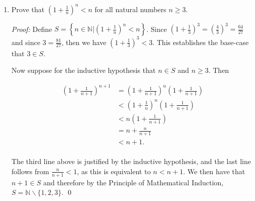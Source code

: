 \documentclass[12pt]{article}
\begin{document}
{\begin{enumerate}
Now suppose for the inductive hypothesis that $n\in \mathbb{N}$ and $n\in S$.  Since $n\in S$ we can infer that there is some $k\in \mathbb{Z}$ such that $3^{4n+1} - 5^{2n-1} = 7k$.  Hence

\begin{align*}
  3^{4(n+1)+1}-5^{2(n+1)-1} &= 3^{4n+5} - 5^{2n+1} \\[.3cm]
  &= 3^4\cdot 3^{4n+1}-5^2\cdot 5^{2n-1} \\[.3cm]
  &= (77+4)3^{4n+1} + (21+4)5^{2n-1} \\[.3cm]
  &= 77\cdot 3^{4n+1}-21\cdot 5^{2n-1}+4(3^{4n+1}-5^{2n-1}) \\[.3cm]
  &= 7(11\cdot 3^{4n+1}-3\cdot 5^{2n-1})+4\cdot 7k \\[.3cm]
  &= 7(11\cdot 3^{4n+1}-3\cdot 5^{2n-1}+28). \\
\end{align*}

Therefore $3^{4(n+1)+1}-5^{2(n+1)-1} = 3^{4n+5} - 5^{2n+1}$ is divisible by 7, which is the condition for $n+1\in S$.  So by the Principle of Mathematical Induction we have $S=\mathbb{N}$, which is to say that for every $n\in\mathbb{N}$ we have that $3^{4n+1}-5^{2n-1}$ is divisible by 7. \qed

\item Prove that $\displaystyle \left(1 + \frac{1}{n}\right)^n < n$ for all natural numbers $n \geq 3$.

{\it Proof:} Define $S=\left\{n\in\mathbb{N}|\left(1+\frac 1 n\right)^n<n\right\}$.  Since $\left(1+\frac 1 3\right)^3 = \left(\frac{4}{3}\right)^3 = \frac{64}{27}$ and since $3 = \frac{81}{27}$, then we have $(1+\frac 1 3)^3 < 3$.  This establishes the base-case that $3\in S$.

Now suppose for the inductive hypothesis that $n\in S$ and $n\geq 3$.  Then

\begin{align*}
  \left(1+\frac 1 {n+1}\right)^{n+1} & = \left(1+\frac 1 {n+1}\right)^{n}\left(1+\frac 1 {n+1}\right) \\[.3cm]
  &< \left(1+\frac 1 {n}\right)^{n} \left(1+\frac 1 {n+1}\right) \\[.3cm]
  &< n\left(1+\frac{1}{n+1}\right) \\[.3cm]
  &= n+\frac{n}{n+1} \\[.3cm]
  &< n+1.\\
\end{align*}

The third line above is justified by the inductive hypothesis, and the last line follows from $\frac{n}{n+1} < 1$, as this is equivalent to $n < n+1$.  We then have that $n+1\in S$ and therefore by the Principle of Mathematical Induction, $S = \mathbb{N}\smallsetminus\{1,2,3\}.$ \qed


\end{enumerate}}
\end{document}

